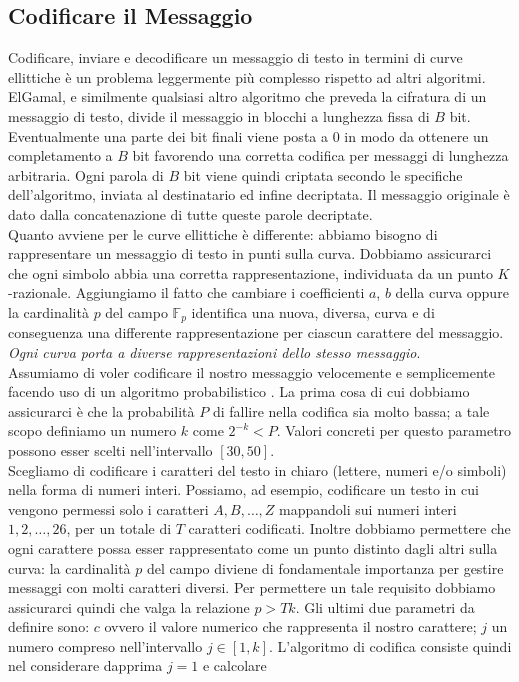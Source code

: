 \documentclass[a4paper,12pt]{tesiinfo}
\begin{document}
\subsection{Codificare il Messaggio}
\label{codifica}
Codificare, inviare e decodificare un messaggio di testo in termini di curve ellittiche \`e un problema leggermente pi\`u complesso rispetto ad altri algoritmi. ElGamal, e similmente qualsiasi altro algoritmo che preveda la cifratura di un messaggio di testo, divide il messaggio in blocchi a lunghezza fissa di $B$ bit. Eventualmente una parte dei bit finali viene posta a 0 in modo da ottenere un completamento a $B$ bit favorendo una corretta codifica per messaggi di lunghezza arbitraria. Ogni parola di $B$ bit viene quindi criptata secondo le specifiche dell'algoritmo, inviata al destinatario ed infine decriptata. Il messaggio originale \`e dato dalla concatenazione di tutte queste parole decriptate.
\\
Quanto avviene per le curve ellittiche \`e differente: abbiamo bisogno di rappresentare un messaggio di testo in punti sulla curva. Dobbiamo assicurarci che ogni simbolo abbia una corretta rappresentazione, individuata da un punto $K$-razionale. Aggiungiamo il fatto che cambiare i coefficienti $a$, $b$ della curva oppure la cardinalit\`a $p$ del campo $\mathbb{F}_p$ identifica una nuova, diversa, curva e di conseguenza una differente rappresentazione per ciascun carattere del messaggio. \textit{Ogni curva porta a diverse rappresentazioni dello stesso messaggio}.
\\
Assumiamo di voler codificare il nostro messaggio velocemente e semplicemente facendo uso di un algoritmo probabilistico \cite{codifica messaggi su CE}. La prima cosa di cui dobbiamo assicurarci \`e che la probabilit\`a $P$ di fallire nella codifica sia molto bassa; a tale scopo definiamo un numero $k$ come $2^{-k} < P$. Valori concreti per questo parametro possono esser scelti nell'intervallo $[30, 50]$.
\\
Scegliamo di codificare i caratteri del testo in chiaro (lettere, numeri e/o simboli) nella forma di numeri interi. Possiamo, ad esempio, codificare un testo in cui vengono permessi solo i caratteri $A, B, \ldots, Z$ mappandoli sui numeri interi $1, 2, \ldots, 26$, per un totale di $T$ caratteri codificati. Inoltre dobbiamo permettere che ogni carattere possa esser rappresentato come un punto distinto dagli altri sulla curva: la cardinalit\`a $p$ del campo diviene di fondamentale importanza per gestire messaggi con molti caratteri diversi. Per permettere un tale requisito dobbiamo assicurarci quindi che valga la relazione $p > Tk$. Gli ultimi due parametri da definire sono: $c$ ovvero il valore numerico che rappresenta il nostro carattere; $j$ un numero compreso nell'intervallo $j \in [1, k]$. L'algoritmo di codifica consiste quindi nel considerare dapprima $j=1$ e calcolare
\end{document}
